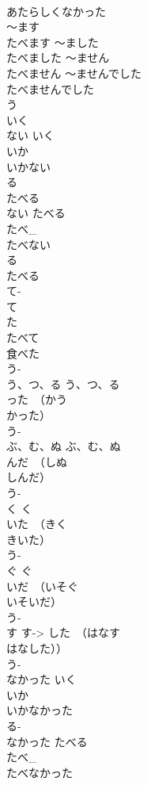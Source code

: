 \documentclass[8pt]{extreport}
\begin{document}
\begin{CJK}{UTF8}{min}
\\	あたらしくなかった
\\	～ます 
\\	たべます ～ました 
\\	たべました ～ません 
\\	たべません ～ませんでした 
\\	たべませんでした
\\	う　
\\	いく	
\\	ない いく 
\\	いか 
\\	いかない　
\\	る　
\\	たべる	
\\	ない たべる 
\\	たべ_ 
\\	たべない
\\	る 
\\	たべる	
\\	て-
\\	て 
\\	た 
\\	たべて 
\\	食べた
\\	う-
\\	う、つ、る	う、つ、る　
\\	った　（かう 
\\	かった）
\\	う-
\\	ぶ、む、ぬ	ぶ、む、ぬ　
\\	んだ　（しぬ 
\\	しんだ）
\\	う-
\\	く	く 
\\	いた　（きく 
\\	きいた）
\\	う-
\\	ぐ	ぐ　
\\	いだ　（いそぐ 
\\	いそいだ）
\\	う-
\\	す	す-> した　（はなす　
\\	はなした））
\\	う-
\\	なかった いく　
\\	いか　 
\\	いかなかった
\\	る-
\\	なかった たべる　
\\	たべ_　 
\\	たべなかった
\end{CJK}
\end{document}
